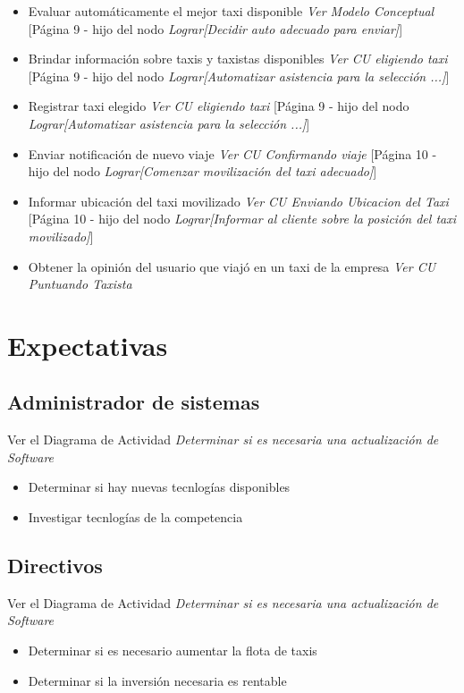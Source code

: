\documentclass[a4paper]{article}
\begin{document}
\begin{itemize}
\item Evaluar autom\'aticamente el mejor taxi disponible \textit{Ver Modelo Conceptual} [P\'agina 9 - hijo del nodo \textit{Lograr[Decidir auto adecuado para enviar]}]
\item Brindar informaci\'on sobre taxis y taxistas disponibles \textit{Ver CU eligiendo taxi} [P\'agina 9 - hijo del nodo \textit{Lograr[Automatizar asistencia para la selecci\'on ...]}]
\item Registrar taxi elegido \textit{Ver CU eligiendo taxi} [P\'agina 9 - hijo del nodo \textit{Lograr[Automatizar asistencia para la selecci\'on ...]}]
\item Enviar notificaci\'on de nuevo viaje \textit{Ver CU Confirmando viaje} [P\'agina 10 - hijo del nodo \textit{Lograr[Comenzar movilizaci\'on del taxi adecuado]}]
\item Informar ubicaci\'on del taxi movilizado \textit{Ver CU Enviando Ubicacion del Taxi} [P\'agina 10 - hijo del nodo \textit{Lograr[Informar al cliente sobre la posici\'on del taxi movilizado]}]

\item Obtener la opini\'on del usuario que viaj\'o en un taxi de la empresa \textit{Ver CU Puntuando Taxista}

\end{itemize}


\section{Expectativas}


\subsection{Administrador de sistemas}
Ver el Diagrama de Actividad \textit{Determinar si es necesaria una actualizaci\'on de Software}
\begin{itemize}
 \item Determinar si hay nuevas tecnlog\'ias disponibles
 \item Investigar tecnlog\'ias de la competencia

\end{itemize}



\subsection{Directivos}
Ver el Diagrama de Actividad \textit{Determinar si es necesaria una actualizaci\'on de Software}
\begin{itemize}
 \item Determinar si es necesario aumentar la flota de taxis
 \item Determinar si la inversi\'on necesaria es rentable
\end{itemize}
\end{document}
